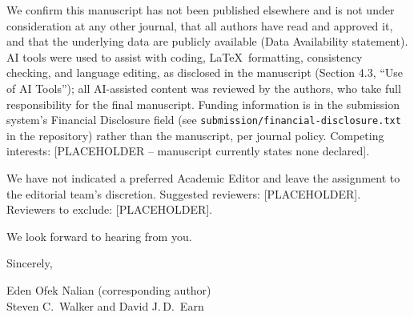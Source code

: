 \documentclass[11pt]{article}
\begin{document}
We confirm this manuscript has not been published elsewhere and is not under consideration at any other journal, that all authors have read and approved it, and that the underlying data are publicly available (Data Availability statement). AI tools were used to assist with coding, \LaTeX\ formatting, consistency checking, and language editing, as disclosed in the manuscript (Section 4.3, ``Use of AI Tools''); all AI-assisted content was reviewed by the authors, who take full responsibility for the final manuscript. Funding information is in the submission system's Financial Disclosure field (see \texttt{submission/financial-disclosure.txt} in the repository) rather than the manuscript, per journal policy. Competing interests: [PLACEHOLDER -- manuscript currently states none declared].

We have not indicated a preferred Academic Editor and leave the assignment to the editorial team's discretion. Suggested reviewers: [PLACEHOLDER]. Reviewers to exclude: [PLACEHOLDER].

We look forward to hearing from you.

\smallskip

\noindent Sincerely,

\smallskip

\noindent Eden Ofek Nalian (corresponding author) \\
Steven C.\ Walker and David J.\,D.\ Earn  
\end{document}
